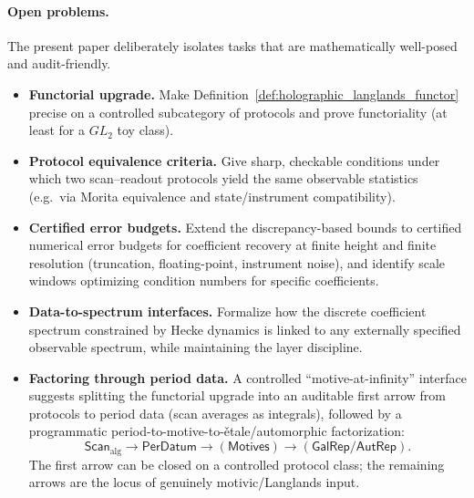 \paragraph{Open problems.}
The present paper deliberately isolates tasks that are mathematically well-posed and audit-friendly.
\begin{itemize}
\item \textbf{Functorial upgrade.} Make Definition~\ref{def:holographic_langlands_functor} precise on a controlled subcategory of protocols and prove functoriality (at least for a $GL_2$ toy class).
\item \textbf{Protocol equivalence criteria.} Give sharp, checkable conditions under which two scan--readout protocols yield the same observable statistics (e.g.\ via Morita equivalence and state/instrument compatibility).
\item \textbf{Certified error budgets.} Extend the discrepancy-based bounds to certified numerical error budgets for coefficient recovery at finite height and finite resolution (truncation, floating-point, instrument noise), and identify scale windows optimizing condition numbers for specific coefficients.
\item \textbf{Data-to-spectrum interfaces.} Formalize how the discrete coefficient spectrum constrained by Hecke dynamics is linked to any externally specified observable spectrum, while maintaining the layer discipline.
\item \textbf{Factoring through period data.} A controlled ``motive-at-infinity'' interface \cite{Ma2025MAI} suggests splitting the functorial upgrade into an auditable first arrow from protocols to period data (scan averages as integrals), followed by a programmatic period-to-motive-to-\v{e}tale/automorphic factorization:
\[
\mathsf{Scan}_{\mathrm{alg}}\to \mathsf{PerDatum}\to (\mathsf{Motives}) \to (\mathsf{GalRep}/\mathsf{AutRep}).
\]
The first arrow can be closed on a controlled protocol class; the remaining arrows are the locus of genuinely motivic/Langlands input.
\end{itemize}


